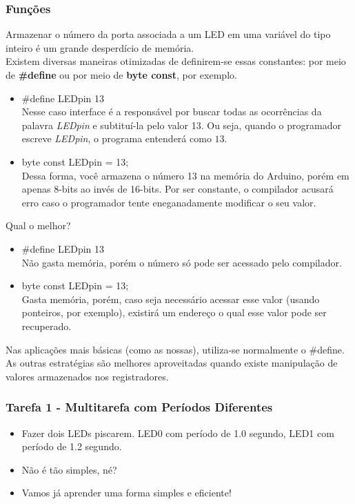 \documentclass{beamer}
\begin{document}
\begin{frame}
	\frametitle{Funç\~oes}
	Armazenar o número da porta associada a um LED em uma variável do tipo inteiro é um grande desperdício de memória.\\[5pt]
	Existem diversas maneiras otimizadas de definirem-se essas constantes: por meio de \textbf{\#define} ou por meio de \textbf{byte const}, por exemplo.\\[5pt]
	\begin{itemize}
		\item \#define LEDpin 13 \\[5pt]
		Nesse caso interface é a responsável por buscar todas as ocorrências da palavra \textit{LEDpin} e subtituí-la pelo valor 13. Ou seja, quando o programador escreve \textit{LEDpin}, o programa entenderá como $13$.
		\item byte const LEDpin = 13; \\[5pt]
		Dessa forma, você armazena o número 13 na memória do Arduino, porém em apenas 8-bits ao invés de 16-bits. Por ser constante, o compilador acusará erro caso o programador tente eneganadamente modificar o seu valor.
	\end{itemize}
\end{frame}

\begin{frame}
Qual o melhor?
	\begin{itemize}
		\item \#define LEDpin 13 \\[5pt]
		Não gasta memória, porém o número só pode ser acessado pelo compilador.
		\item byte const LEDpin = 13; \\[5pt]
		Gasta memória, porém, caso seja necessário acessar esse valor (usando ponteiros, por exemplo), existirá um endereço o qual esse valor pode ser recuperado.
	\end{itemize}
	Nas aplicações mais básicas (como as nossas), utiliza-se normalmente o \#define. As outras estratégias são melhores aproveitadas quando existe manipulação de valores armazenados nos registradores.
\end{frame}

\begin{frame}
	\frametitle{Tarefa 1 - Multitarefa com Períodos Diferentes}
	\begin{itemize}
	\item<1-> Fazer dois LEDs piscarem. LED0 com período de 1.0 segundo, LED1 com período de 1.2 segundo.
	\item<2-> Não é tão simples, né?
	\item<3-> Vamos já aprender uma forma simples e eficiente!
	\end{itemize}
\end{frame}
\end{document}
